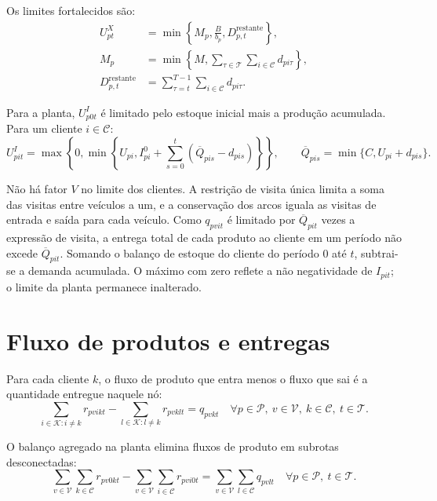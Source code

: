 \documentclass[11pt,a4paper]{article}
\newcommand{\set}[1]{\mathcal{#1}}
\begin{document}
Os limites fortalecidos são:
\begin{align}
  U^X_{pt} &= \min\left\{M_p,\frac{B}{b_p},D^{\mathrm{restante}}_{p,t}\right\},
  \label{eq:production-upper-bound}\\
  M_p &= \min\left\{M,\sum_{\tau\in\set{T}}\sum_{i\in\set{C}}d_{pi\tau}\right\},
  \label{eq:product-big-m}\\
  D^{\mathrm{restante}}_{p,t} &= \sum_{\tau=t}^{T-1}\sum_{i\in\set{C}}d_{pi\tau}.
  \label{eq:remaining-demand}
\end{align}

Para a planta, $U^I_{p0t}$ é limitado pelo estoque inicial mais a produção
acumulada. Para um cliente $i\in\set{C}$:
\begin{equation}
  U^I_{pit}=\max\left\{0,\min\left\{U_{pi},I^0_{pi}+
  \sum_{s=0}^{t}\left(\overline Q_{pis}-d_{pis}\right)\right\}\right\},
  \qquad
  \overline Q_{pis}=\min\{C,U_{pi}+d_{pis}\}.
  \label{eq:inventory-upper-bound}
\end{equation}

Não há fator $V$ no limite dos clientes. A restrição de visita única limita a
soma das visitas entre veículos a um, e a conservação dos arcos iguala as
visitas de entrada e saída para cada veículo. Como $q_{pvit}$ é limitado por
$\overline Q_{pit}$ vezes a expressão de visita, a entrega total de cada
produto ao cliente em um período não excede $\overline Q_{pit}$. Somando o
balanço de estoque do cliente do período $0$ até $t$, subtrai-se a demanda
acumulada. O máximo com zero reflete a não negatividade de $I_{pit}$; o limite
da planta permanece inalterado.

\section{Fluxo de produtos e entregas}

Para cada cliente $k$, o fluxo de produto que entra menos o fluxo que sai é a
quantidade entregue naquele nó:
\begin{equation}
  \sum_{i\in\set{K}:i\ne k}r_{pvikt}
  -\sum_{l\in\set{K}:l\ne k}r_{pvklt}
  =q_{pvkt}
  \quad \forall p\in\set{P},\ v\in\set{V},\ k\in\set{C},\ t\in\set{T}.
  \label{eq:product-flow-customer}
\end{equation}

O balanço agregado na planta elimina fluxos de produto em subrotas
desconectadas:
\begin{equation}
  \sum_{v\in\set{V}}\sum_{k\in\set{C}}r_{pv0kt}
  -\sum_{v\in\set{V}}\sum_{i\in\set{C}}r_{pvi0t}
  =\sum_{v\in\set{V}}\sum_{l\in\set{C}}q_{pvlt}
  \quad \forall p\in\set{P},\ t\in\set{T}.
  \label{eq:product-flow-plant}
\end{equation}
\end{document}
